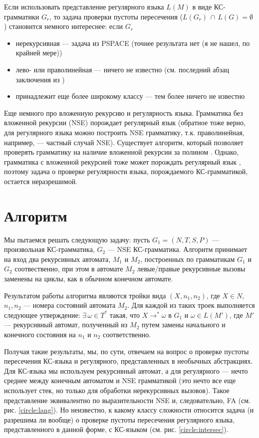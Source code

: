 \documentclass[10pt]{article}
\begin{document}
	Если использовать представление регулярного языка $L(M)$ в виде КС-грамматики $G_r$, то задача проверки пустоты пересечения ($L(G_r) \, \cap \, L(G) = \emptyset$) становится немного интереснее: если $G_r$ 
	\begin{itemize}
		\item нерекурсивная --- задача из PSPACE \cite{Nederhof} (точнее результата нет (я не нашел, по крайней мере))
		\item лево- или праволинейная --- ничего не известно (см. последний абзац заключения из \cite{Nederhof})
		\item принадлежит еще более широкому классу --- тем более ничего не известно
	\end{itemize}
	
	Еще немного про вложенную рекурсию и регулярность языка. Грамматика без вложенной рекурсии (NSE) порождает регулярный язык \cite{Chomsky} (обратное тоже верно, для регулярного языка можно построить NSE грамматику, т.к. праволинейная, например, --- частный случай NSE). Существует алгоритм, который позволяет проверять грамматику на наличие вложенной рекурсии за полином \cite{Anselmo}. Однако, грамматика с вложенной рекурсией тоже может порождать регулярный язык \cite{Andrei2004}, поэтому задача о проверке регулярности языка, порождаемого КС-грамматикой, остается неразрешимой. 
	
	\section{Алгоритм}
	
	Мы пытаемся решать следующую задачу: пусть $G_1 = (N, T, S, P)$ --- произвольная КС-грамматика, $G_2$ --- NSE КС-грамматика. Алгоритм принимает на вход два рекурсивных автомата, $M_1$ и $M_2$, построенных по грамматикам $G_1$ и $G_2$ соотвественно, при этом в автомате $M_2$ левые/правые рекурсивные вызовы заменены на циклы, как в обычном конечном автомате.
	
	Результатом работы алгоритма являются тройки вида $(X, n_1, n_2)$, где $X \in N$, $n_1, n_2$ --- номера состояний автомата $M_2$. 
	Для каждой из таких троек выполняется следующее утверждение: $\exists \, \omega \in T^*$ такая, что $X \rightarrow^* \omega$ в $G_1$ и $\omega \in L(M')$, где $M'$ --- рекурсивный автомат, полученный из $M_2$ путем замены начального и конечного состояния на $n_1$ и $n_2$ соответственно.
	
	Получая такие результаты, мы, по сути, отвечаем на вопрос о проверке пустоты пересечения КС-языка и регулярного, представленных в необычных абстракциях. 
	Для КС-языка мы используем рекурсивный автомат, а для регулярного --- нечто среднее между конечным автоматом и NSE грамматикой (это нечто все еще использует стек, но только для обработки нерекурсивных вызовов). 
	Такое представление эквивалентно по выразительности NSE и, следовательно, FA (см. рис. \ref{circle:lang}). 
	Но неизвестно, к какому классу сложности относится задача (и разрешима ли вообще) о проверке пустоты пересечения регулярного языка, представленного в данной форме, с КС-языком (см. рис. \ref{circle:intersec}).
	
\end{document}
